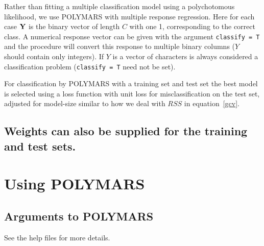Rather than fitting a multiple classification model using a polychotomous
likelihood, we  use POLYMARS with multiple response regression. Here for
each case
${\bf Y}$ is the binary vector of length $C$ with one 1, corresponding
to the correct class.
A numerical response
vector can be given with the argument {\tt classify = T} and
the procedure will convert this response to multiple 
binary columns ($Y$
should contain only integers). If $Y$
is a vector of characters is always considered a classification
problem ({\tt classify = T} need not be set). 

For classification by POLYMARS with a training set and test set the
best model is selected using a loss function with unit loss for
misclassification on the test set, adjusted for model-size similar
to how we deal with $RSS$ 
in equation~\ref{gcv}.

\subsection*{Weights can also be supplied for the training and test sets.}

\section{Using POLYMARS}\label{using}
\subsection{Arguments to POLYMARS}

See the help files for more details.

